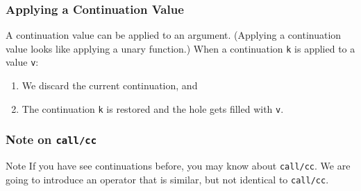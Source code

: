 \documentclass[8pt,pdf,handout]{beamer}
\begin{document}
\begin{frame}[fragile]
\frametitle{Applying a Continuation Value}

A continuation value can be applied to an argument. (Applying a continuation
value looks like applying a unary function.) When a continuation \lstinline|k|
is applied to a value \lstinline|v|:

\begin{enumerate}
  \item We discard the current continuation, and
  \item The continuation \lstinline|k| is restored and the hole
  gets filled with \lstinline|v|.
\end{enumerate}


\end{frame}

\begin{frame}

\frametitle{Note on \texttt{call/cc}}

\begin{alertblock}{Note}
If you have see continuations before, you may know about
\texttt{call/cc}. We are going to introduce an operator that is
similar, but not identical to \texttt{call/cc}.
\end{alertblock}

\end{frame}
\end{document}
